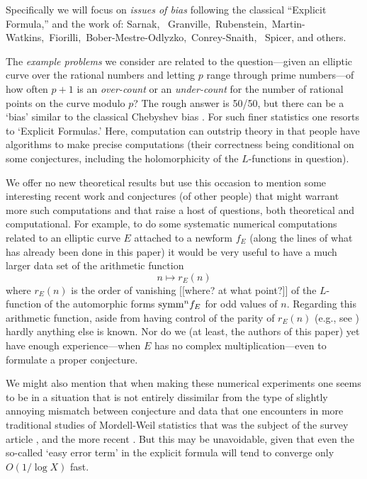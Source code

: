 \documentclass[11pt]{article}
\theoremstyle{plain}
\theoremstyle{definition}
\numberwithin{equation}{section}
\numberwithin{figure}{section}
\numberwithin{table}{section}
\begin{document}
  Specifically we will  focus on {\it issues of bias}  following the classical ``Explicit Formula,'' and the work of:
Sarnak, \ Granville,\  Rubenstein,\, Martin-Watkins,\ Fiorilli,\ Bober-Mestre-Odlyzko,\ Conrey-Snaith, \ Spicer, and others.


 The {\it example problems} we consider are related to the question---given an elliptic curve over the rational numbers and letting  $p$ range through prime numbers---of how often  $p+1$ is an {\it over-count} or an {\it under-count} for the number of rational points on the curve modulo $p$? The rough answer is 50/50, but there can be a `bias' similar to the classical Chebyshev bias  \cite{R-S}. For such finer statistics one resorts to `Explicit Formulas.'  Here, computation can  outstrip theory in that people have algorithms to make precise computations (their correctness being conditional on some conjectures, including the holomorphicity of the $L$-functions in question).



 We offer no new theoretical results but use this occasion to mention some interesting recent work and conjectures  (of other people)  that might warrant more such computations and that raise a host of questions, both theoretical and computational.   For example, to do some systematic numerical computations related to an elliptic curve $E$ attached to a newform $f_E$  (along the lines of what has already been done in this paper)  it would be very useful to have a much larger data set  of the arithmetic function  $$n \mapsto r_E(n)$$
 where $r_E(n)$ is the order of vanishing [[where? at what point?]] of the $L$-function of the automorphic forms ${\rm symm}^n f_E$ for odd values of $n$.  Regarding this arithmetic function, aside from having control of the parity of   $r_E(n)$  (e.g., see \cite{DMW})  hardly anything else is known. Nor do we (at least, the authors of this paper)  yet have enough
 experience---when $E$ has no complex multiplication---even to formulate a proper conjecture.

 We might also mention that when making these numerical experiments one seems to be in a situation  that is not entirely dissimilar from the type of slightly annoying mismatch between conjecture and data that one encounters in more traditional studies of Mordell-Weil statistics  that was the subject of the survey article \cite{bmsw:bulletins}, and the more recent \cite{ecdb:height}.  But this may be unavoidable, given that even  the so-called  `easy error term' in the explicit formula will tend to converge  only $O(1/\log X)$ fast.
\end{document}
